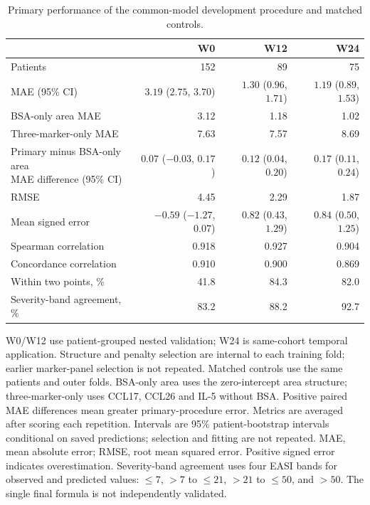 \begin{table}[htbp]
\centering\small
\caption{Primary performance of the common-model development procedure and matched controls.}\label{tab:model}
\begin{tabular}{lrrr}\toprule
 & W0 & W12 & W24 \\ \midrule
Patients & 152 & 89 & 75 \\
MAE (95\% CI) & $3.19$ ($2.75$, $3.70$) & $1.30$ ($0.96$, $1.71$) & $1.19$ ($0.89$, $1.53$) \\
BSA-only area MAE & 3.12 & 1.18 & 1.02 \\
Three-marker-only MAE & 7.63 & 7.57 & 8.69 \\
\shortstack[l]{Primary minus BSA-only area\\MAE difference (95\% CI)} & $0.07$ ($-0.03$, $0.17$) & $0.12$ ($0.04$, $0.20$) & $0.17$ ($0.11$, $0.24$) \\
RMSE & 4.45 & 2.29 & 1.87 \\
Mean signed error & $-0.59$ ($-1.27$, $0.07$) & $0.82$ ($0.43$, $1.29$) & $0.84$ ($0.50$, $1.25$) \\
Spearman correlation & 0.918 & 0.927 & 0.904 \\
Concordance correlation & 0.910 & 0.900 & 0.869 \\
Within two points, \% & 41.8 & 84.3 & 82.0 \\
Severity-band agreement, \% & 83.2 & 88.2 & 92.7 \\
\bottomrule\end{tabular}
\par\small\raggedright W0/W12 use patient-grouped nested validation; W24 is same-cohort temporal application. Structure and penalty selection are internal to each training fold; earlier marker-panel selection is not repeated. Matched controls use the same patients and outer folds. BSA-only area uses the zero-intercept area structure; three-marker-only uses CCL17, CCL26 and IL-5 without BSA. Positive paired MAE differences mean greater primary-procedure error. Metrics are averaged after scoring each repetition. Intervals are 95\% patient-bootstrap intervals conditional on saved predictions; selection and fitting are not repeated. MAE, mean absolute error; RMSE, root mean squared error. Positive signed error indicates overestimation. Severity-band agreement uses four EASI bands for observed and predicted values: $\leq7$, $>7$ to $\leq21$, $>21$ to $\leq50$, and $>50$. The single final formula is not independently validated.\end{table}
